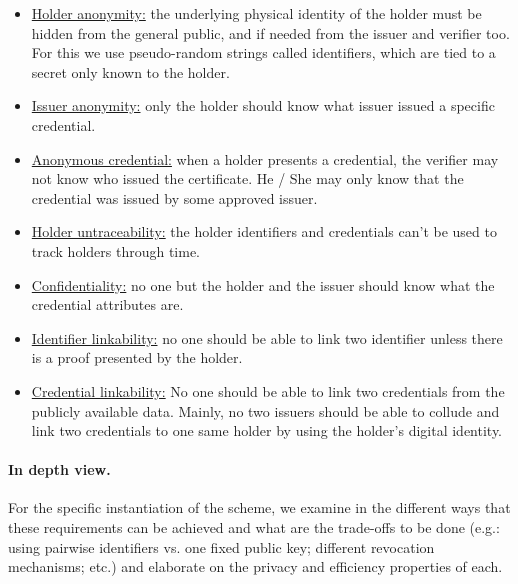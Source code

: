 \begin{itemize}
		\item \underline{Holder anonymity:} the underlying physical identity of the holder must be hidden from the general public, and if needed from the issuer and verifier too. For this we use pseudo-random strings called identifiers, which are tied to a secret only known to the holder. 
		\item \underline{Issuer anonymity:} only the holder should know what issuer issued a specific credential.
		\item \underline{Anonymous credential:} when a holder presents a credential, the verifier may not know who issued the certificate. He / She may only know that the credential was issued by some approved issuer.
		\item \underline{Holder untraceability:} the holder identifiers and credentials can’t be used to track holders through time.
		\item \underline{Confidentiality:} no one but the holder and the issuer should know what the credential attributes are.
		\item \underline{Identifier linkability:} no one should be able to link two identifier unless there is a proof presented by the holder.
		\item \underline{Credential linkability:} No one should be able to link two credentials from the publicly available data. Mainly, no two issuers should be able to collude and link two credentials to one same holder by using the holder’s digital identity.
\end{itemize}



\paragraph{In depth view.} 
For the specific instantiation of the scheme, we examine 
in 
the different ways that these requirements can be achieved and what are the trade-offs to be done (e.g.: using pairwise identifiers vs. one fixed public key; different revocation mechanisms; etc.) and elaborate on the privacy and efficiency properties of each. 



